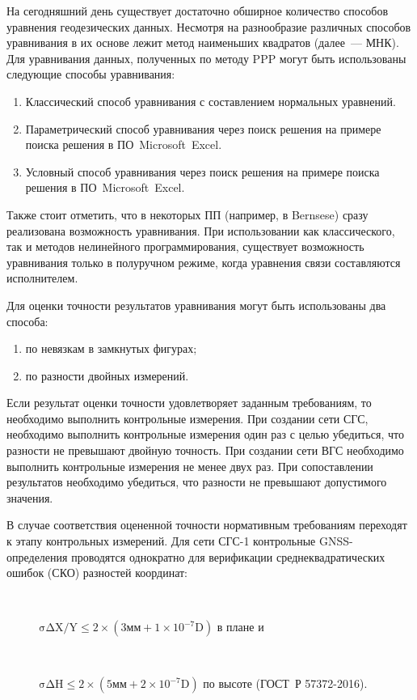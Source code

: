 На сегодняшний день существует достаточно обширное количество способов уравнения геодезических данных. Несмотря на разнообразие различных способов уравнивания в их основе лежит метод наименьших квадратов (далее~--- МНК). Для уравнивания данных, полученных по методу PPP могут быть использованы следующие способы уравнивания: 
\begin{enumerate}
	\item Классический способ уравнивания с составлением нормальных уравнений.
	\item Параметрический способ уравнивания через поиск решения на примере поиска решения в ПО~Microsoft~Excel.
	\item Условный способ уравнивания через поиск решения на примере поиска решения в ПО~Microsoft~Excel.
\end{enumerate}

Также стоит отметить, что в некоторых ПП (например, в Bernsese) сразу реализована возможность уравнивания. При использовании как классического, так и методов нелинейного программирования, существует возможность уравнивания только в полуручном режиме, когда уравнения связи составляются исполнителем. 

Для оценки точности результатов уравнивания могут быть использованы два способа: 
\begin{enumerate}
	\item по невязкам в замкнутых фигурах;
	\item по разности двойных измерений.
\end{enumerate}


Если результат оценки точности удовлетворяет заданным требованиям, то необходимо выполнить контрольные измерения. При создании сети СГС, необходимо выполнить контрольные измерения один раз с целью убедиться, что разности не превышают двойную точность.  При создании сети ВГС необходимо выполнить контрольные измерения не менее двух раз. При сопоставлении результатов необходимо убедиться, что разности не превышают допустимого значения. 


В случае соответствия оцененной точности нормативным требованиям переходят к этапу контрольных измерений. Для сети СГС-1 контрольные GNSS-определения проводятся однократно для верификации среднеквадратических ошибок (СКО) разностей координат:
\begin{description}
	\item[~] $\mathrm{\sigma \Delta X/Y \leqslant 2 \times (3 \text{мм} + 1 \times 10^{-7}D)}$ в плане и
	\item[~] $\mathrm{\sigma \Delta H \leqslant 2 \times (5 \text{мм} + 2 \times 10^{-7}D)}$ по высоте (ГОСТ~Р 57372-2016).
\end{description}
\smallskip

